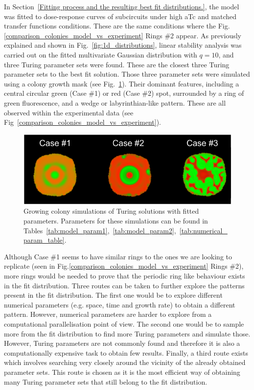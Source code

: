 In Section~\ref{Fitting process and the resulting best fit distributions.}, the model was fitted to dose-response curves of subcircuits under high aTc and matched transfer functions conditions.
These are the same conditions where the Fig.\ref{comparison_colonies_model_vs_experiment} Rings \#2 appear.
As previously explained and shown in Fig.~\ref{fig:1d_distributions}, linear stability analysis was carried out on the fitted multivariate Gaussian distribution with $q=10$, and three Turing parameter sets were found.
These are the closest three Turing parameter sets to the best fit solution.
Those three parameter sets were simulated using a colony growth mask (see Fig.~\ref{best_fit_colony_turing}).
Their dominant features, including a central circular green (Case \#1) or red (Case \#2) spot, surrounded by a ring of green fluorescence, and a wedge or labyrinthian-like pattern.
These are all observed within the experimental data (see Fig~\ref{comparison_colonies_model_vs_experiment}).

\begin{figure}[H]
    \centering

    \includegraphics[width=1\textwidth]{chapters/Chapter 3/best_fit_colony_turing}
    \caption{Growing colony simulations of Turing solutions with fitted parameters. Parameters for these simulations can be found in Tables~\ref{tab:model_param1},~\ref{tab:model_param2},~\ref{tab:numerical_param_table}.}
    \label{best_fit_colony_turing}
\end{figure} %

Although Case \#1 seems to have similar rings to the ones we are looking to replicate (seen in Fig.\ref{comparison_colonies_model_vs_experiment} Rings \#2), more rings would be needed to prove that the periodic ring like behaviour exists in the fit distribution.
Three routes can be taken to further explore the patterns present in the fit distribution.
The first one would be to explore different numerical parameters (e.g. space, time and growth rate) to obtain a different pattern.
However, numerical parameters are harder to explore from a computational parallelisation point of view.
The second one would be to sample more from the fit distribution to find more Turing parameters and simulate those.
However, Turing parameters are not commonly found and therefore it is also a computationally expensive task to obtain few results.
Finally, a third route exists which involves searching very closely around the vicinity of the already obtained parameter sets.
This route is chosen as it is the most efficient way of obtaining many Turing parameter sets that still belong to the fit distribution.

